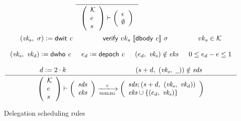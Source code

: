 \begin{figure}[htb]
  \begin{equation}
    \inference
    {
    }
    {
      {\left(\begin{array}{l}
       \mathcal{K}\\
        e\\
        s
      \end{array}\right)}
      \vdash
      \left(
        \begin{array}{l}
          \epsilon\\
          \emptyset
        \end{array}
      \right)
    }
  \end{equation}
  \nextdef
  \begin{equation}
    \label{eq:rule:delegation-scheduling}
    \inference
    {
      (\var{vk_s},~ \sigma) \leteq \dwit{c}
      & \verify{vk_s}{\serialised{\dbody{c}}}{\sigma} & vk_s \in \mathcal{K}\\ ~ \\
      (\var{vk_s},~ \var{vk_d}) \leteq \dwho{c} & e_d \leteq \depoch{c}
      & (e_d,~ \var{vk_s}) \notin \var{eks} & 0 \leq e_d - e \leq 1 \\ ~ \\
      d \leteq 2 \cdot k & (s + d,~ (\var{vk_s},~ \wcard)) \notin \var{sds}\\
    }
    {
      {\left(\begin{array}{l}
       \mathcal{K}\\
        e\\
        s
      \end{array}\right)}
      \vdash
      {
        \left(
          \begin{array}{l}
            \var{sds}\\
            \var{eks}
          \end{array}
        \right)
      }
      \trans{sdeleg}{c}
      {
        \left(
          \begin{array}{l}
            \var{sds}; (s + d,~ (\var{vk_s},~ \var{vk_d}))\\
            \var{eks} \cup \{(e_d,~ \var{vk_s})\}
          \end{array}
        \right)
      }
    }
  \end{equation}
  \caption{Delegation scheduling rules}
  \label{fig:rules:delegation-scheduling}
\end{figure}

\clearpage

